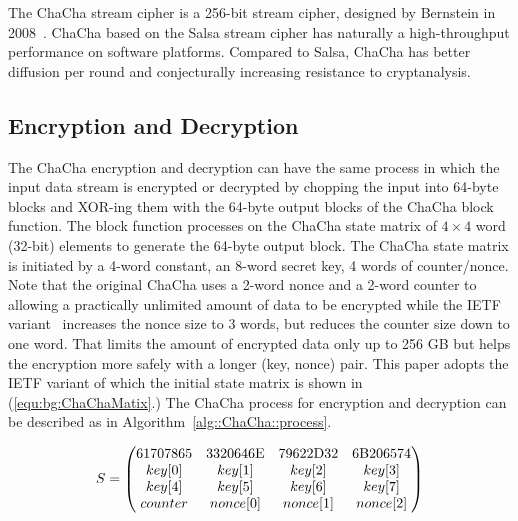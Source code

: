 The ChaCha stream cipher is a 256-bit stream cipher, designed by Bernstein in 2008~\cite{Ber:08}.
ChaCha based on the Salsa stream cipher has naturally a high-throughput performance on software platforms.
Compared to Salsa, ChaCha has better diffusion per round and conjecturally increasing resistance to cryptanalysis. 

\subsection{Encryption and Decryption}
The ChaCha encryption and decryption can have the same process in which the input data stream is encrypted or decrypted by chopping the input into 64-byte blocks and XOR-ing them with the 64-byte output blocks of the ChaCha block function. The block function processes on the ChaCha state matrix of $4\times4$ word (32-bit) elements to generate the 64-byte output block.
The ChaCha state matrix is initiated by a 4-word constant, an 8-word secret key, 4 words of counter/nonce. 
Note that the original ChaCha uses a 2-word nonce and a 2-word counter to allowing a practically unlimited amount of data to be encrypted while the IETF variant~\cite{RFC:18} increases the nonce size to 3 words, but reduces the counter size down to one word.
That limits the amount of encrypted data only up to 256 GB but helps the encryption more safely with a longer (key, nonce) pair. 
This paper adopts the IETF variant of which the initial state matrix is shown in (\ref{equ:bg:ChaChaMatix}.) %
The ChaCha process for encryption and decryption can be described as in Algorithm~\ref{alg::ChaCha::process}.

\begin{equation}
S=
\begin{pmatrix}
$61707865$ & $3320646E$ & $79622D32$ & $6B206574$ \\
key[$0$] & key[$1$]   & key[$2$]   & key[$3$] \\
key[$4$] & key[$5$]   & key[$6$]   & key[$7$] \\
counter  & nonce[$0$] & nonce[$1$] & nonce[$2$] \\
\end{pmatrix} 
\label{equ:bg:ChaChaMatix}
\end{equation}

